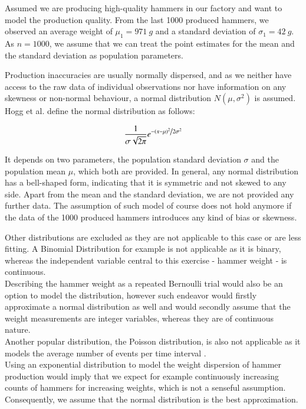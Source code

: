 Assumed we are producing high-quality hammers in our factory and want to model the production quality. From the last 1000 produced hammers, we observed an average weight of $\mu_1=971~g$ and a standard deviation of $\sigma_1 = 42~g$. As $n = 1000$, we assume that we can treat the point estimates for the mean and the standard deviation as population parameters.

Production inaccuracies are usually normally dispersed, and as we neither have access to the raw data of individual observations nor have information on any skewness or non-normal behaviour, a normal distribution $N(\mu, \sigma^2)$ is assumed.
Hogg et al. \cite[Definition~3.4.1]{hogg} define the normal distribution as follows: 

\begin{equation} \frac{1}{{\sigma \sqrt {2\pi } }}e^{{{ - \left( {x - \mu } \right)^2 } \mathord{\left/ {\vphantom {{ - \left( {x - \mu } \right)^2 } {2\sigma ^2 }}} \right. \kern-\nulldelimiterspace}{2\sigma ^2 }}}
\label{eq:normaldist}
\end{equation}


It depends on two parameters, the population standard deviation $\sigma$ and the population mean $\mu$, which both are provided. In general, any normal distribution has a bell-shaped form, indicating that it is symmetric and not skewed to any side. Apart from the mean and the standard deviation, we are not provided any further data.  The assumption of such model of course does not hold anymore if the data of the 1000 produced hammers introduces any kind of bias or skewness. 


Other distributions are excluded as they are not applicable to this case or are less fitting. A Binomial Distribution for example is not applicable as it is binary, whereas the independent variable central to this exercise - hammer weight - is continuous. \\Describing the hammer weight as a repeated Bernoulli trial would also be an option to model the distribution, however such endeavor would firstly approximate a normal distribution as well and would secondly assume that the weight measurements are integer variables, whereas they are of continuous nature. \\
Another popular distribution, the Poisson distribution, is also not applicable as it models the average number of events per time interval \cite{bruce2017practical}. \\
Using an exponential distribution to model the weight dispersion of hammer production would imply that we expect for example continuously increasing counts of hammers for increasing weights, which is not a senseful assumption. \\
Consequently, we assume that the normal distribution is the best approximation.

